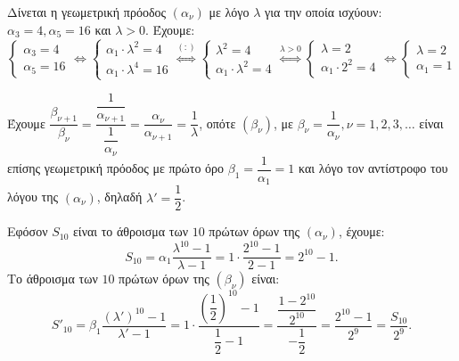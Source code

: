 
\begin{alist}
\item Δίνεται η γεωμετρική πρόοδος $(\alpha_\nu)$ με λόγο $\lambda$ για την οποία ισχύουν:
$\alpha_3 = 4, \alpha_5 = 16$ και $\lambda > 0$.
Έχουμε:
\[\begin{cases} \alpha_3 = 4 \\ \alpha_5 = 16 \end{cases} \Leftrightarrow \begin{cases} \alpha_1 \cdot \lambda^2 = 4 \\ \alpha_1 \cdot \lambda^4 = 16 \end{cases} \stackrel{(:)}{\Leftrightarrow} \begin{cases} \lambda^2 = 4 \\ \alpha_1 \cdot \lambda^2 = 4 \end{cases} \stackrel{\lambda > 0}{\Leftrightarrow} \begin{cases} \lambda = 2 \\ \alpha_1 \cdot 2^2 = 4 \end{cases} \Leftrightarrow \begin{cases} \lambda = 2 \\ \alpha_1 = 1 \end{cases}\]

\item Έχουμε
$\dfrac{\beta_{\nu+1}}{\beta_\nu} = \dfrac{\dfrac{1}{\alpha_{\nu+1}}}{\dfrac{1}{\alpha_\nu}} = \dfrac{\alpha_\nu}{\alpha_{\nu+1}} = \dfrac{1}{\lambda}$, οπότε $(\beta_\nu)$, με $\beta_\nu = \dfrac{1}{\alpha_\nu}, \nu = 1, 2, 3, \dots$ είναι επίσης
γεωμετρική πρόοδος με πρώτο όρο $\beta_1 = \dfrac{1}{\alpha_1} = 1$ και λόγο τον αντίστροφο του λόγου της
$(\alpha_\nu)$, δηλαδή $\lambda' = \dfrac{1}{2}$.

\item Εφόσον $S_{10}$ είναι το άθροισμα των $10$ πρώτων όρων της $(\alpha_\nu)$, έχουμε:
\[S_{10} = \alpha_1 \dfrac{\lambda^{10} - 1}{\lambda - 1} = 1 \cdot \dfrac{2^{10} - 1}{2 - 1} = 2^{10} - 1.\]
Το άθροισμα των $10$ πρώτων όρων της $(\beta_\nu)$ είναι:
\[S'_{10} = \beta_1 \dfrac{(\lambda')^{10} - 1}{\lambda' - 1} = 1 \cdot \dfrac{\left(\dfrac{1}{2}\right)^{10} - 1}{\dfrac{1}{2} - 1} = \dfrac{\dfrac{1 - 2^{10}}{2^{10}}}{-\dfrac{1}{2}} = \dfrac{2^{10} - 1}{2^9} = \dfrac{S_{10}}{2^9}.\]
\end{alist}

